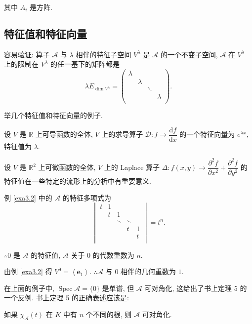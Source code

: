 \documentclass[color=black,device=normal,lang=cn,mode=geye]{elegantnote}
\begin{document}
其中 $A_i$ 是方阵.
\subsection{特征值和特征向量}
容易验证: 算子 $\mathcal{A}$ 与 $\lambda$ 相伴的特征子空间 $V^\lambda$ 是 $\mathcal{A}$ 的一个不变子空间, $\mathcal{A}$ 在 $V^\lambda$ 上的限制在 $V^\lambda$ 的任一基下的矩阵都是
\[\lambda E_{\dim V^\lambda}=\begin{pmatrix}
    \lambda \\
    & \lambda \\
    && \ddots \\
    &&& \lambda \\
\end{pmatrix}.\]

举几个特征值和特征向量的例子.
\begin{example}
    设 $V$ 是 $\mathbb{R}$ 上可导函数的全体, $V$ 上的求导算子 $\mathcal{D}:f\to \dfrac{\mathrm{d}f}{\mathrm{d}x}$ 的一个特征向量为 $e^{\lambda x}$, 特征值为 $\lambda$.
\end{example}
\begin{example}
    设 $V$ 是 $\mathbb{R}^2$ 上可微函数的全体, $V$ 上的 Laplace 算子 $\Delta:f(x,y)\to\dfrac{\partial^2f}{\partial x^2}+\dfrac{\partial^2f}{\partial y^2}$ 的特征值在一些特定的流形上的分析中有重要意义.
\end{example}
\begin{example}
    例 \ref{exa3.2} 中的 $\mathcal{A}$ 的特征多项式为
    \[\begin{vmatrix}
        t & 1 \\
        & t & 1 \\
        && \ddots & \ddots \\
        &&& t & 1 \\
        &&&& t \\
    \end{vmatrix}=t^n.\]

    $\therefore0$ 是 $\mathcal{A}$ 的特征值, $\mathcal{A}$ 关于 $0$ 的代数重数为 $n$.

    由例 \ref{exa3.2} 得 $V^0=\left<\boldsymbol{e}_1\right>$. $\therefore\mathcal{A}$ 与 $0$ 相伴的几何重数为 $1$.
\end{example}
在上面的例子中, $\operatorname{Spec}\mathcal{A}=\{0\}$ 是单谱, 但 $\mathcal{A}$ 可对角化, 这给出了书上定理 5 的一个反例. 书上定理 5 的正确表述应该是:
\begin{theorem}\label{t3.2}
    如果 $\chi_{\mathcal{A}}(t)$ 在 $K$ 中有 $n$ 个不同的根, 则 $\mathcal{A}$ 可对角化.
\end{theorem}
\end{document}

